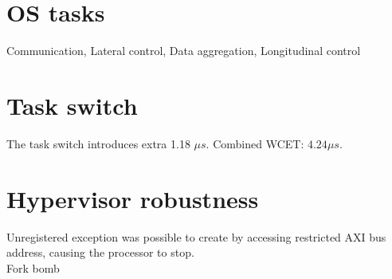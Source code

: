 \section{OS tasks}
Communication, Lateral control, Data aggregation, Longitudinal control

\section{Task switch}
The task switch introduces extra 1.18 $\mu s$. Combined WCET: $4.24 \mu s$.

\section{Hypervisor robustness}
Unregistered exception was possible to create by accessing restricted AXI bus address, causing the processor to stop.\\

Fork bomb

